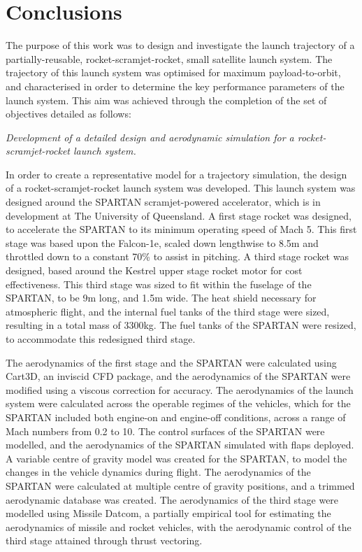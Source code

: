 
\cleardoublepage
\chapter{Conclusions}


The purpose of this work was to design and investigate the launch trajectory of a partially-reusable, rocket-scramjet-rocket, small satellite launch system. 
The trajectory of this launch system was optimised for maximum payload-to-orbit, and characterised in order to determine the key performance parameters of the launch system. 
This aim was achieved through the completion of the set of objectives detailed as follows:

\vspace{10pt}
	\emph{Development of a detailed design and aerodynamic simulation for a rocket-scramjet-rocket launch system.}
	
	In order to create a representative model for a trajectory simulation, the design of a rocket-scramjet-rocket launch system was developed. This launch system was designed around the SPARTAN scramjet-powered accelerator, which is in development at The University of Queensland. A first stage rocket was designed, to accelerate the SPARTAN to its minimum operating speed of Mach 5. This first stage was based upon the Falcon-1e, scaled down lengthwise to 8.5m and throttled down to a constant 70\% to assist in pitching.
	A third stage rocket was designed, based around the Kestrel upper stage rocket motor for cost effectiveness. This third stage was sized to fit within the fuselage of the SPARTAN, to be 9m long, and 1.5m wide. The heat shield necessary for atmospheric flight, and the internal fuel tanks of the third stage were sized, resulting in a total mass of 3300kg. The fuel tanks of the SPARTAN were resized, to accommodate this redesigned third stage. 

The aerodynamics of the first stage and the SPARTAN were calculated using Cart3D, an inviscid CFD package, and the aerodynamics of the SPARTAN were modified using a viscous correction for accuracy. The aerodynamics of the launch system were calculated across the operable regimes of the vehicles, which for the SPARTAN included both engine-on and engine-off conditions, across a range of Mach numbers from 0.2 to 10. The control surfaces of the SPARTAN were modelled, and the aerodynamics of the SPARTAN simulated with flaps deployed. A variable centre of gravity model was created for the SPARTAN, to model the changes in the vehicle dynamics during flight. The aerodynamics of the SPARTAN were calculated at multiple centre of gravity positions, and a trimmed aerodynamic database was created. 
The aerodynamics of the third stage were modelled using Missile Datcom, a partially empirical tool for estimating the aerodynamics of missile and rocket vehicles, with the aerodynamic control of the third stage attained through thrust vectoring. 

